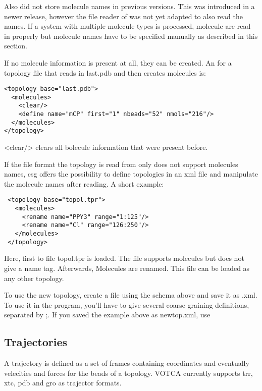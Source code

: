 Also \gromacs did not store molecule names in previous versions. This was introduced in a newer release, however the file reader of \votca was not yet adapted to also read the names. If a system with multiple molecule types is processed, molecule are read in properly but molecule names have to be specified manually as described in this section.

If no molecule information is present at all, they can be created. An for a topology file that reads in last.pdb and then creates molecules is:
\begin{verbatim}
<topology base="last.pdb">
  <molecules>
    <clear/>
    <define name="mCP" first="1" nbeads="52" nmols="216"/>
  </molecules>
</topology>
\end{verbatim}
<clear/> clears all bolecule information that were present before.

If the file format the topology is read from only does not support molecules names, csg offers the possibility to define topologies in an xml file and manipulate the molecule names after reading. A short example:
\begin{verbatim}
 <topology base="topol.tpr">
   <molecules>
     <rename name="PPY3" range="1:125"/>
     <rename name="Cl" range="126:250"/>
   </molecules>
 </topology>
\end{verbatim}
Here, first to file topol.tpr is loaded. The file supports molecules but does not give a name tag. Afterwards, Molecules are renamed. This file can be loaded as any other topology.

To use the new topology, create a file using the schema above and save it as .xml. To use it in the program, you'll have to give several coarse graining definitions, separated by ;. If you saved the example above as newtop.xml, use 

\subsection{Trajectories}
A trajectory is defined as a set of frames containing coordinates and eventually velecities and forces for the beads of a topology.
VOTCA currently supports trr, xtc, pdb and gro as trajector formats.






